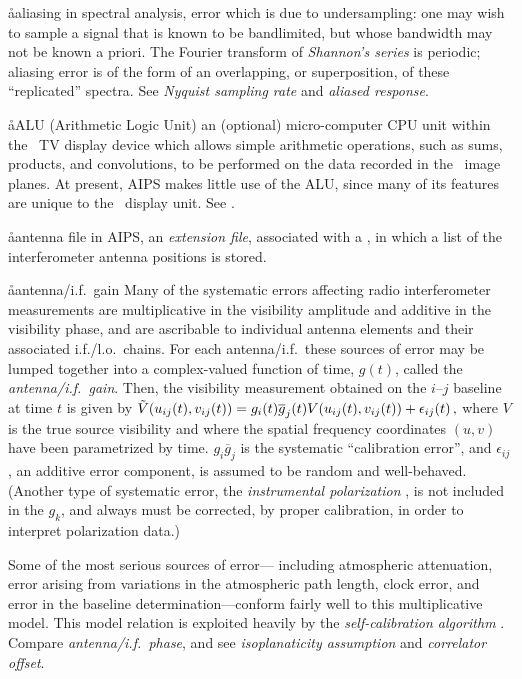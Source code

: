 \aa{aliasing}
in spectral analysis, error which is due to undersampling:
one may wish to sample a signal that is known to be bandlimited,
but whose bandwidth may not be known a priori.
The Fourier transform of {\it Shannon's series} is periodic;
aliasing error is of the form of an overlapping, or superposition,
of these ``replicated'' spectra.
See {\it Nyquist sampling rate} and {\it aliased response}.

\aa{ALU}
(Arithmetic Logic Unit) an (optional) micro-computer CPU unit
within the \iis\ TV display device which allows simple
arithmetic operations, such as sums, products, and convolutions,
to be performed on the data recorded in the \iis\ image planes.
At present, AIPS makes little use of the ALU, since
many of its features are unique to the \iis\ display unit.
See {\it \iis}.

\aa{antenna file}
in AIPS, an {\it extension file}, associated with a ,
in which a list of the interferometer antenna positions is stored.

\aa{antenna/i.f.\ gain}
Many of the systematic errors affecting radio interferometer measurements
are multiplicative in the visibility amplitude and
additive in the visibility phase,
and are ascribable to individual antenna elements and their
associated i.f./l.o.\ chains.
For each antenna/i.f.\
these sources of error may be lumped together into a
complex-valued function of time, $g(t)$, called the
{\it antenna/i.f.\ gain}.
Then, the visibility measurement obtained on the $i$--$j$
baseline at time $t$ is given by
$\tilde V(u_{ij}(t),v_{ij}(t))=g_i(t)\overline g_j(t)V(u_{ij}(t),v_{ij}(t))
+\epsilon_{ij}(t)\,,$
where $V$ is the true source visibility and where the spatial
frequency coordinates $(u,v)$ have been parametrized by time.
$g_i\overline g_j$ is the systematic ``calibration error'',
and $\epsilon_{ij}$, an additive error component, is
assumed to be random and well-behaved.
(Another type of systematic error, the {\it instrumental
polarization} \qv, is not included in the $g_k$,
and always must be corrected, by proper calibration,
in order to interpret polarization data.)
\par
Some of the most serious sources of error---%
including atmospheric attenuation, error arising from variations
in the atmospheric path length,
clock error, and error in the baseline
determination---conform fairly well to this multiplicative model.
This model relation is exploited heavily
by the {\it self-calibration algorithm} \qv.
Compare {\it antenna/i.f.\ phase},
and see {\it isoplanaticity assumption} and {\it correlator offset}.

